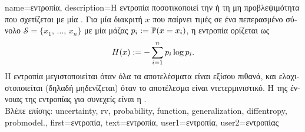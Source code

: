 {name={\foreignlanguage{greek}{εντροπία}},
	description={\foreignlanguage{greek}{Η εντροπία ποσοτικοποιεί την} 
		 \foreignlanguage{greek}{ή τη μη προβλεψιμότητα που σχετίζεται με μία} 
		 \cite{coverthomas}. 
		\foreignlanguage{greek}{Για μία διακριτή}  $x$ \foreignlanguage{greek}{που παίρνει 
		τιμές σε ένα πεπερασμένο σύνολο $\mathcal{S} = \{x_1, \,\ldots, \,x_n\}$ με μία} 
		\foreignlanguage{greek}{μάζας}  $p_i := \mathbb{P}({x = x_i})$, \foreignlanguage{greek}{η 
		εντροπία ορίζεται ως}
		\[
		H(x) := -\sum_{i=1}^n p_i \log p_i.
		\]
		\foreignlanguage{greek}{Η εντροπία μεγιστοποιείται όταν όλα τα αποτελέσματα είναι εξίσου πιθανά, 
		και ελαχιστοποιείται (δηλαδή μηδενίζεται) όταν το αποτέλεσμα είναι ντετερμινιστικό. Η} 
		 \foreignlanguage{greek}{της έννοιας της εντροπίας για συνεχείς} 
		 \foreignlanguage{greek}{είναι η} . \\
		\foreignlanguage{greek}{Βλέπε επίσης:} \gls{uncertainty}, \gls{rv}, \gls{probability}, \gls{function}, \gls{generalization}, 
		\gls{diffentropy}, \gls{probmodel}.},
	first={\foreignlanguage{greek}{εντροπία}},
	text={\foreignlanguage{greek}{εντροπία}},
	user1={\foreignlanguage{greek}{εντροπία}}, %
  	user2={\foreignlanguage{greek}{εντροπίας}} %
}

